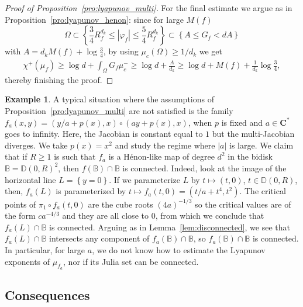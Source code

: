 \documentclass[oneside, 12pt]{amsart}
\newcommand{\disk}{\mathbb{D}}
\newcommand{\set}[1]{\left\{#1\right\}}
\newcommand{\abs}[1]{\left\vert#1\right\vert}
\newcommand{\unsur}[1]{\frac{1}{#1}}
\newcommand{\C}{\mathbf{C}}
\newcommand{\bb}{\mathbb{B}}
\newcommand{\romain}[1]{{\color{blue}*}\marginpar{\tiny  \color{blue} RD: #1}}
\theoremstyle{plain}
\theoremstyle{definition}
\newtheorem{eg}[thm]{Example}
\numberwithin{equation}{section}       %
\numberwithin{equation}{section}       %
\begin{document}
\begin{proof}[Proof of Proposition~\ref{pro:lyapunov_multi}]
For the final estimate we argue as in Proposition~\ref{pro:lyapunov_henon}: since for large $M(f)$ 
\begin{equation}
\Omega\subset \set {\frac34 R_f^{d_k}\leq \abs{\varphi_f}\leq \frac54R_f^{d_k} } \subset
\set{A\leq  G_f<  dA} 
\end{equation}
with 
$ A = d_k M(f)+  \log\frac34$,    by using 
 $\mu_c(\Omega)\geq 1/d_k$    we get 
 \begin{align} \label{eq:lower_lyap_multi}
\chi^+(\mu_f) \geq   
\log d + \int_{\Omega} G_f\mu_c^- 
\geq \log d+ \frac{A}{d_k}  
\geq \log d +M(f) + \unsur{d_k} \log\frac34,
\end{align}
thereby finishing the proof.  
 \end{proof}

 
 
\begin{eg}\label{eg:fafinva} 
A typical situation where the assumptions  of Proposition~\ref{pro:lyapunov_multi}  
are not satisfied   is the family 
$f_a(x,y) = (y/a+p(x),x )\circ (ay+p(x), x)$, when $p$ is fixed and $a\in \C^*$ goes to infinity. 
Here, the Jacobian is constant equal to $1$ but the multi-Jacobian diverges.
We take $p(x) = x^2$  and study 
 the regime where $\abs{a}$ is large. We claim that if   $R  \geq 1$ is such that 
 $f_a$ is a Hénon-like map of degree $d^2$ in the bidisk $\bb= \disk(0, R)^2$, then 
 $f(\bb)\cap \bb$ is connected. Indeed, look at the image of the horizontal line $L=\set{y=0}$.
  If we parameterize $L$ by $ t\mapsto (t, 0)$, $t\in \disk(0, R)$, then, $f_a(L)$  
 is parameterized by $t\mapsto f_a(t, 0) = (t/a+t^4, t^2)$. The critical points of $\pi_1\circ f_a(t, 0)$ are the cube roots $(4a)^{-1/3}$ so the critical values are of the form $ca^{-4/3}$ and they are all close to 0, from which we conclude that $f_a(L)\cap \bb$ is connected. 
 Arguing as in Lemma~\ref{lem:disconnected}, we see that $f_a(L)\cap \bb$ intersects 
 any component of $f_a(\bb)\cap \bb$, so $f_a(\bb)\cap \bb$ is connected. 
In particular, for large $a$,  we do not know how to estimate the Lyapunov exponents of $\mu_{f_a}$, 
nor if its Julia set can be connected. 
\end{eg}


\subsection{Consequences} \label{subs:comments_corollaries}
\end{document}
